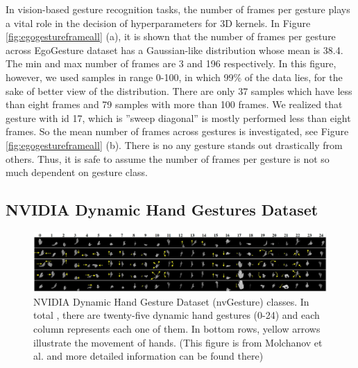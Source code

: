 In vision-based gesture recognition tasks, the number of frames per gesture plays a vital role in the decision of hyperparameters for 3D kernels.  In Figure  \ref{fig:egogestureframeall} (a),  it is shown that the number of frames per gesture across EgoGesture dataset has a Gaussian-like distribution whose mean is 38.4. The min and max number of frames are 3 and 196 respectively.  In this figure, however, we used samples in range 0-100, in which 99\% of the data lies, for the sake of better view of the distribution. There are only 37 samples which have less than eight frames and 79 samples with more than  100 frames. We realized that gesture with id 17, which is ”sweep diagonal” is mostly performed less than eight frames.  So  the mean number of frames across gestures is investigated, see Figure \ref{fig:egogestureframeall} (b). There is no any gesture stands out drastically from others.   Thus,  it is safe to assume the number of frames per gesture is not so much dependent on gesture class. \\

\subsection{NVIDIA Dynamic Hand Gestures Dataset}
\label{subsec:nvidia}
\begin{figure}[H]
	\centering
	\includegraphics[width=1\linewidth]{figures/nvidia_classes_all}
	\caption{NVIDIA Dynamic Hand Gesture Dataset (nvGesture) classes. In total , there are twenty-five dynamic hand gestures (0-24) and each column represents each one of them. In bottom rows, yellow arrows illustrate the movement of hands. (This figure is from Molchanov et al. \cite{molchanov_online_2016} and more detailed information can be found there)}
	\label{fig:nvgesturesall}
\end{figure}


